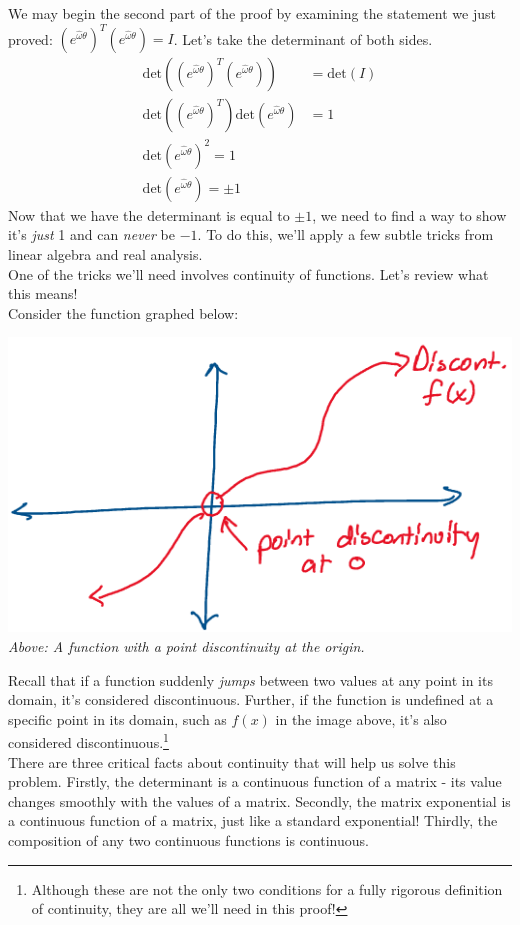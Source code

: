 \documentclass[oneside]{book}
\begin{document}
We may begin the second part of the proof by examining the statement we just proved: $(e^{\hat\omega\theta})^{T}(e^{\hat\omega\theta}) = I$. Let's take the determinant of both sides.
\begin{align}
    \mathrm{det}((e^{\hat\omega\theta})^{T}(e^{\hat\omega\theta})) &= \mathrm{det}(I)\\
    \mathrm{det}((e^{\hat\omega\theta})^{T})\mathrm{det}(e^{\hat\omega\theta}) &= 1\\
    \mathrm{det}(e^{\hat\omega\theta})^2 = 1\\
    \mathrm{det}(e^{\hat\omega\theta}) = \pm 1 
\end{align}
Now that we have the determinant is equal to $\pm 1$, we need to find a way to show it's \textit{just} 1 and can \textit{never} be $-1$. To do this, we'll apply a few subtle tricks from linear algebra and real analysis.\\
One of the tricks we'll need involves continuity of functions. Let's review what this means!\\
Consider the function graphed below:
\begin{center}
    \includegraphics[scale=0.5]{images/discont.png}\\
    \textit{Above: A function with a point discontinuity at the origin.}
\end{center}
Recall that if a function suddenly \textit{jumps} between two values at any point in its domain, it's considered discontinuous. Further, if the function is undefined at a specific point in its domain, such as $f(x)$ in the image above, it's also considered discontinuous.\footnote{Although these are not the only two conditions for a fully rigorous definition of continuity, they are all we'll need in this proof!}\\
There are three critical facts about continuity that will help us solve this problem. Firstly, the determinant is a continuous function of a matrix - its value changes smoothly with the values of a matrix. Secondly, the matrix exponential is a continuous function of a matrix, just like a standard exponential! Thirdly, the composition of any two continuous functions is continuous.\\
\end{document}
